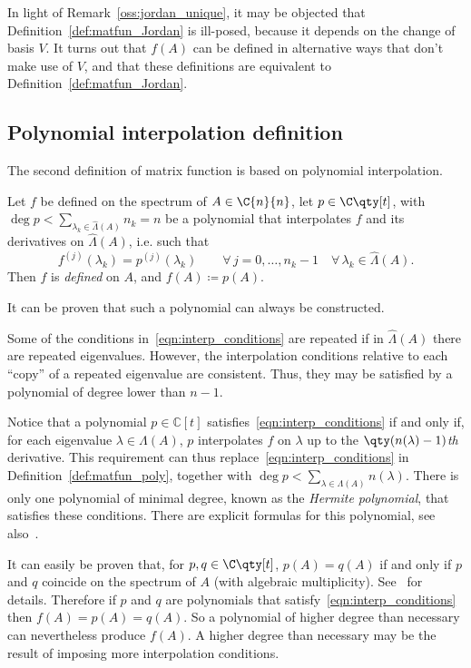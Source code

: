 In light of Remark~\ref{oss:jordan_unique}, it may be objected that Definition~\ref{def:matfun_Jordan} is ill-posed, because it depends on the change of basis $V$. It turns out that $f(A)$ can be defined in alternative ways that don't make use of $V$, and that these definitions are equivalent to Definition~\ref{def:matfun_Jordan}. 

\subsection*{Polynomial interpolation definition}
The second definition of matrix function is based on polynomial interpolation.

\begin{definizione}\label{def:matfun_poly}
	Let $f$ be defined on the spectrum of $A\in\C{n}{n}$, let $p\in\C\qty[t]$, with $\deg{p}<\sum_{\lambda_k\in\hat{\Lambda}(A)}n_k=n$ be a polynomial that interpolates $f$ and its derivatives on $\hat{\Lambda}(A)$, i.e. such that 
	\begin{equation}\label{eqn:interp_conditions}
		f^{(j)}(\lambda_k)=p^{(j)}(\lambda_k)\qquad\forall\,j=0,\dots,n_k-1\quad\forall\,\lambda_k\in\hat{\Lambda}(A).
	\end{equation}
	Then $f$ is \emph{defined} on $A$, and $f(A)\coloneqq p(A)$.
\end{definizione}
It can be proven that such a polynomial can always be constructed.

Some of the conditions in~\eqref{eqn:interp_conditions} are repeated if in $\hat{\Lambda}(A)$ there are repeated eigenvalues. However, the interpolation conditions relative to each ``copy'' of a repeated eigenvalue are consistent. Thus, they may be satisfied by a polynomial of degree lower than $n-1$. 

Notice that a polynomial $p\in\mathbb{C}[t]$ satisfies~\eqref{eqn:interp_conditions} if and only if, for each eigenvalue $\lambda\in\Lambda(A)$, $p$ interpolates $f$ on $\lambda$ up to the $\qty(n(\lambda)-1)$\emph{th} derivative. This requirement can thus replace~\eqref{eqn:interp_conditions} in Definition~\ref{def:matfun_poly}, together with $\deg{p}<\sum_{\lambda\in\Lambda(A)}n(\lambda)$. There is only one polynomial of minimal degree, known as the \emph{Hermite polynomial}, that satisfies these conditions. There are explicit formulas for this polynomial, see also~\cite[§~1.2.2]{higham:matfun_book}.

It can easily be proven that, for $p,q\in\C\qty[t]$, $p(A)=q(A)$ if and only if $p$ and $q$ coincide on the spectrum of $A$ (with algebraic multiplicity). See~\cite[Thm.~1.3]{higham:matfun_book} for details. Therefore if $p$ and $q$ are polynomials that satisfy~\eqref{eqn:interp_conditions} then $f(A)=p(A)=q(A)$. So a polynomial of higher degree than necessary can nevertheless produce $f(A)$. A higher degree than necessary may be the result of imposing more interpolation conditions.

